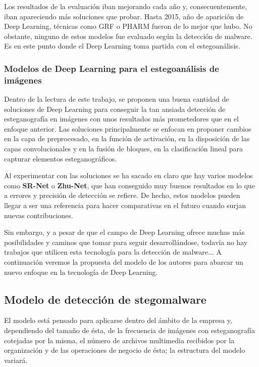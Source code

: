 Los resultados de la evaluación iban mejorando cada año y, consecuentemente, iban apareciendo más soluciones que probar. Hasta 2015, año de aparición de Deep Learning, técnicas como GRF o PHARM fueron de lo mejor que hubo. No obstante, ninguno de estos modelos fue evaluado según la detección de malware. Es en este punto donde el Deep Learning toma partida con el estegoanálisis.

\subsubsection{Modelos de Deep Learning para el estegoanálisis de imágenes}

Dentro de la lectura de este trabajo, se proponen una buena cantidad de soluciones de Deep Learning para conseguir la tan ansiada detección de esteganografía en imágenes con unos resultados más prometedores que en el enfoque anterior. Las soluciones principalmente se enfocan en proponer cambios en la capa de preprocesado, en la función de activación, en la disposición de las capas convolucionales y en la fusión de bloques, en la clasificación lineal para capturar elementos esteganográficos.

Al experimentar con las soluciones se ha sacado en claro que hay varios modelos como \textbf{SR-Net} o \textbf{Zhu-Net}, que han conseguido muy buenos resultados en lo que a errores y precisión de detección se refiere. De hecho, estos modelos pueden llegar a ser una referencia para hacer comparativas en el futuro cuando surjan nuevas contribuciones.

Sin embargo, y a pesar de que el campo de Deep Learning ofrece muchas más posibilidades y caminos que tomar para seguir desarrollándose, todavía no hay trabajos que utilicen esta tecnología para la detección de malware... A continuación veremos la propuesta del modelo de los autores para abarcar un nuevo enfoque en la tecnología de Deep Learning.

\subsection{Modelo de detección de stegomalware}

El modelo está pensado para aplicarse dentro del ámbito de la empresa y, dependiendo del tamaño de ésta, de la frecuencia de imágenes con esteganografía cotejadas por la misma, el número de archivos multimedia recibidos por la organización y de las operaciones de negocio de ésta; la estructura del modelo variará.


